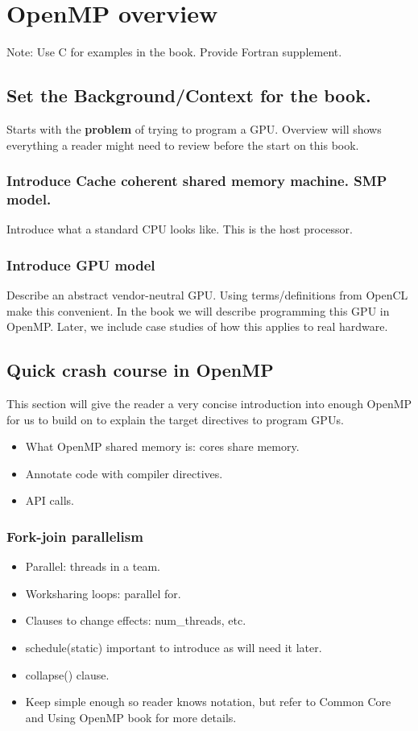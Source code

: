 
\chapter{OpenMP overview}
\label{chapter:overview}

Note: Use C for examples in the book. Provide Fortran supplement.

\section{Set the Background/Context for the book.}

Starts with the {\bf problem} of trying to program a GPU.
Overview will shows everything a reader might need to review before the start on this book.

\subsection{Introduce Cache coherent shared memory machine. SMP model.}
Introduce what a standard CPU looks like. This is the host processor.

\subsection{Introduce GPU model}
Describe an abstract vendor-neutral GPU.
Using terms/definitions from OpenCL make this convenient.
In the book we will describe programming this GPU in OpenMP.
Later, we include case studies of how this applies to real hardware.


\section{Quick crash course in OpenMP}
This section will give the reader a very concise introduction into enough OpenMP for us to build on to explain the target directives to program GPUs.
\begin{itemize}
  \item What OpenMP shared memory is: cores share memory.
  \item Annotate code with compiler directives.
  \item API calls.
\end{itemize}

\subsection{Fork-join parallelism}
\begin{itemize}
  \item Parallel: threads in a team.
  \item Worksharing loops: parallel for.
  \item Clauses to change effects: num\_threads, etc.
  \item schedule(static) important to introduce as will need it later.
  \item collapse() clause.
  \item Keep simple enough so reader knows notation, but refer to Common Core and Using OpenMP book for more details.
\end{itemize}

